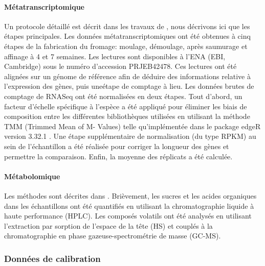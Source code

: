\paragraph*{Métatranscriptomique}
Un protocole détaillé est décrit dans les travaux de \citep{Cao2021}, nous décrivons ici que les étapes principales. Les données métatranscriptomiques ont été obtenues à cinq étapes de la fabrication du fromage: moulage, démoulage, après saumurage et affinage à 4 et 7 semaines. Les lectures sont disponibles à l'ENA (EBI, Cambridge) sous le numéro d'accession PRJEB42478. Ces lectures ont été alignées sur un génome de référence afin de déduire des informations relative à l'expression des gènes, puis uneétape de comptage à lieu. Les données brutes de comptage de RNASeq ont été normalisées en deux étapes. Tout d'abord, un facteur d'échelle spécifique à l'espèce a été appliqué pour éliminer les biais de composition entre les différentes bibliothèques utilisées en utilisant la méthode TMM (Trimmed Mean of M- Values) telle qu'implémentée dans le package edgeR version 3.32.1 \citep{Robinson2010}. Une étape supplémentaire de normalisation (du type RPKM) au sein de l'échantillon a été réalisée pour corriger la longueur des gènes et permettre la comparaison. Enfin, la moyenne des réplicats a été calculée.

\paragraph*{Métabolomique}
Les méthodes sont décrites dans \citep{Cao2021}. Brièvement, les sucres et les acides organiques dans les échantillons ont été quantifiés en utilisant la chromatographie liquide à haute performance (HPLC). Les composés volatils ont été analysés en utilisant l'extraction par sorption de l'espace de la tête (HS) et couplés à la chromatographie en phase gazeuse-spectrométrie de masse (GC-MS).

\subsubsection{Données de calibration}
\label{données-calibration}

